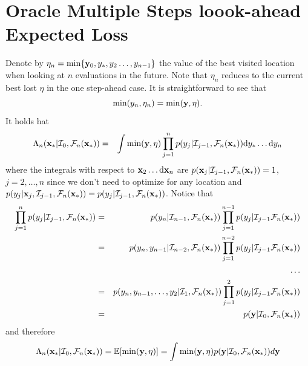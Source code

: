 \documentclass[twoside]{article}
\newcommand{\I}{\mathcal{I}}
\newcommand{\ud}{\mathrm{d}}
\newcommand{\E}{\mathbb{E}}
\newcommand{\future}{\mathcal{F}}
\begin{document}
\section{Oracle Multiple Steps loook-ahead Expected Loss }
Denote by $\eta_n = \min \{\mathbf{y}_0, y_*, y_2\dots,y_{n-1}\}$ the value of the best visited location when looking at $n$ evaluations in the future. Note that $\eta_n$ reduces to the current best lost $\eta$ in the one step-ahead case. It is straightforward to see that 
$$ \min (y_n,\eta_n) = \min (\mathbf{y},\eta ).$$
It holds hat
\begin{eqnarray}\nonumber
\Lambda_n(\latentVector_*|\I_0, \future_{n}(\latentVector_*)) & = & \int \min (\dataVector,\eta) \prod_{j=1}^{n}p(y_{j}|\I_{j-1}, \future_{n}(\latentVector_*)) \ud y_*\dots \ud y_n
\end{eqnarray}
where the integrals with respect to $\latentVector_2\dots \ud\latentVector_n$ are  $p(\latentVector_{j}|\I_{j-1}, \future_{n}(\latentVector_*))=1$, $j=2,\dots,n$ since we don't need to optimize for any location and $p(y_{j}|\latentVector_{j},\I_{j-1}, \future_{n}(\latentVector_*))=p(y_{j}|\I_{j-1}, \future_{n}(\latentVector_*))$. Notice that
\begin{eqnarray}\nonumber
\prod_{j=1}^{n}p(y_{j}|\I_{j-1}, \future_{n}(\latentVector_*))& =& p(y_n|\I_{n-1}, \future_{n}(\latentVector_*)) \prod_{j=1}^{n-1}p(y_{j}|\I_{j-1} \future_{n}(\latentVector_*))\\\nonumber
& = & p(y_n,y_{n-1}|\I_{n-2}, \future_{n}(\latentVector_*))  \prod_{j=1}^{n-2}p(y_{j}|\I_{j-1} \future_{n}(\latentVector_*))\\\nonumber
& & \dots \\\nonumber
& = & p(y_n,y_{n-1},\dots,y_2|\I_{1}, \future_{n}(\latentVector_*))\prod_{j=1}^{2}p(y_{j}|\I_{j-1} \future_{n}(\latentVector_*))\\\nonumber
& = & p(\dataVector|\I_{0}, \future_{n}(\latentVector_*)) \nonumber
\end{eqnarray}
and therefore 
$$ \Lambda_n(\latentVector_*|\I_0, \future_{n}(\latentVector_*)) =\E [\min (\dataVector,\eta)] =\int \min (\dataVector,\eta)p(\dataVector|\I_{0}, \future_{n}(\latentVector_*))d\dataVector  $$

\vspace{1cm}
\end{document}
